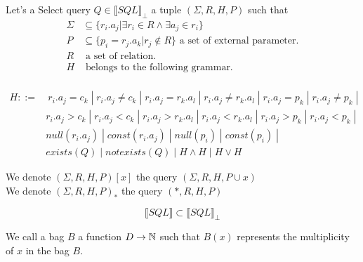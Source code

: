 \begin{mydef}
Let's a Select query $Q \in \llbracket SQL\rrbracket _\bot$ a tuple $(\Sigma,R,H,P)$ such that
\begin{align*}
\Sigma & \subseteq \{r_i.a_j | \exists r_i \in R \land \exists a_j \in r_i \} \\
P & \subseteq \{p_i = r_j.a_k | r_j \notin R\} \mbox{ a set of external parameter.}\\
R & \mbox{ a set of relation.}\\
H &  \mbox{ belongs to the following grammar.}\\
\end{align*}

\begin{align*}
	H ::= &\ r_i.a_j = c_k \; |\; r_i.a_j \neq c_k \; |\; r_i.a_j = r_k.a_l \; |\;  r_i.a_j \neq r_k.a_l \;  |\; r_i.a_j = p_k\; |\; r_i.a_j \neq p_k\; |\; 
	\\ & r_i.a_j > c_k \; |\; r_i.a_j < c_k \; |\; r_i.a_j > r_k.a_l \; |\;  r_i.a_j < r_k.a_l \;  |\; r_i.a_j > p_k\; |\; r_i.a_j < p_k\; |\;
	\\ & null(r_i.a_j) \; |\; const(r_i.a_j) \; |\; null(p_i) \; |\;  const(p_i) \;  |\; 
	\\ &  exists(Q) \; |\; notexists(Q) \; |\;  H\land H \; |\; H \lor H 
\end{align*}

\end{mydef}

We denote $(\Sigma,R,H,P)[x]$ the query $(\Sigma,R,H,P\cup x)$
\\We denote $(\Sigma,R,H,P)_*$ the query $(*,R,H,P)$

\begin{myprop}
	$$\llbracket SQL\rrbracket \subset \llbracket SQL\rrbracket _\bot$$
\end{myprop}

\begin{mydef}
	We call a bag $B$ a function $D \rightarrow \mathbb{N}$ such that $B(x)$ represents the multiplicity of $x$ in the bag $B$.  
\end{mydef}

